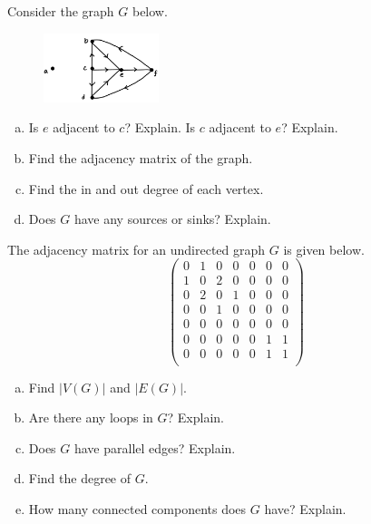 \documentclass[11pt,letterpaper]{article}
\begin{document}
\newpage



 Consider the graph $G$ below.
	\begin{figure}[h]
	\centering
	\includegraphics[width=0.3\textwidth]{graph2.jpg}
	\end{figure}
\begin{enumerate}[(a)]
\item Is $e$ adjacent to $c$? Explain. Is $c$ adjacent to $e$? Explain. 
\item Find the adjacency matrix of the graph.
\item Find the in and out degree of each vertex. 
\item Does $G$ have any sources or sinks? Explain. 
\end{enumerate}



\newpage



 The adjacency matrix for an undirected graph $G$ is given below. 
	\[
	\begin{pmatrix}
	0 & 1 & 0 & 0 & 0 & 0 & 0 \\
	1 & 0 & 2 & 0 & 0 & 0 & 0 \\
	0 & 2 & 0 & 1 & 0 & 0 & 0 \\
	0 & 0 & 1 & 0 & 0 & 0 & 0 \\
	0 & 0 & 0 & 0 & 0 & 0 & 0 \\
	0 & 0 & 0 & 0 & 0 & 1 & 1 \\
	0 & 0 & 0 & 0 & 0 & 1 & 1 \\
	\end{pmatrix}
	\]

\begin{enumerate}[(a)]
\item Find $|V(G)|$ and $|E(G)|$. 
\item Are there any loops in $G$? Explain. 
\item Does $G$ have parallel edges? Explain.
\item Find the degree of $G$. 
\item How many connected components does $G$ have? Explain. 
\end{enumerate}
\end{document}
